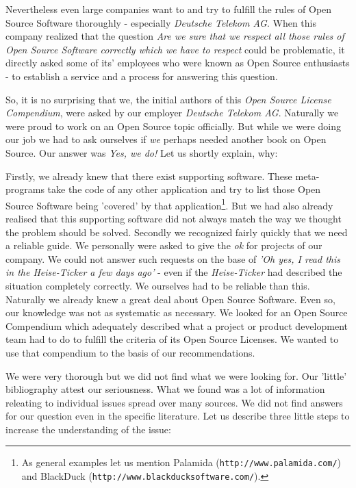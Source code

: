 Nevertheless even large companies want to and try to fulfill the rules of Open
Source Software thoroughly - especially \emph{Deutsche Telekom AG}. When this
company realized that the question \textit{Are we sure that we respect all those
rules of Open Source Software correctly which we have to respect} could be
problematic, it directly asked some of its' employees who were known as Open
Source enthusiasts - to establish a service and a process for answering this
question.

So, it is no surprising that we, the initial authors of this \textit{Open Source
License Compendium}, were asked by our employer \emph{Deutsche Telekom AG}.
Naturally we were proud to work on an Open Source topic officially. But while we
were doing our job we had to ask ourselves if \emph{we} perhaps needed another
book on Open Source. Our answer was \textit{Yes, we do!} Let us shortly explain,
why:

Firstly, we already knew that there exist supporting software. These
meta-pro\-grams take the code of any other application and try to list those
Open Source Software being 'covered' by that application\footnote{As general
examples let us mention Palamida (\texttt{http://www.palamida.com/}) and
BlackDuck (\texttt{http://www.blackducksoftware.com/}).}. But we had also
already realised that this supporting software did not always match the way we
thought the problem should be solved. Secondly we recognized fairly quickly that
we need a reliable guide. We personally were asked to give the \emph{ok} for
projects of our company. We could not answer such requests on the base of
\textit{'Oh yes, I read this in the \emph{Heise-Ticker} a few days ago'} - even
if the \emph{Heise-Ticker} had described the situation completely correctly. We
ourselves had to be reliable than this. Naturally we already knew a great deal
about Open Source Software. Even so, our knowledge was not as systematic as
necessary. We looked for an Open Source Compendium which adequately described
what a project or product development team had to do to fulfill the criteria of
its Open Source Licenses. We wanted to use that compendium to the basis of our
recommendations.

We were very thorough but we did not find what we were looking for. Our 'little'
bibliography attest our seriousness. What we found was a lot of information
releating to individual issues spread over many sources. We did not find answers
for our question even in the specific literature. Let us describe three little
steps to increase the understanding of the issue:


%

